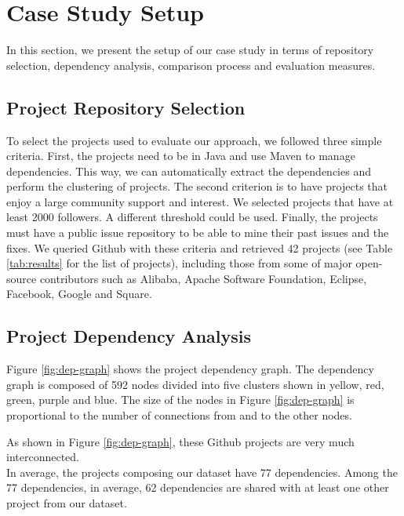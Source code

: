 \section{Case Study Setup}\label{sec:exp}

In this section, we present the setup of our case study in terms of
repository selection, dependency analysis, comparison process and
evaluation measures.

\subsection{Project Repository Selection}\label{sec:rep}

To select the projects used to evaluate our approach, we followed three
simple criteria. First, the projects need to be in Java and use Maven to
manage dependencies. This way, we can automatically extract the
dependencies and perform the clustering of projects. The second
criterion is to have projects that enjoy a large community support and
interest. We selected projects that have at least 2000 followers. A
different threshold could be used. Finally, the projects must have a
public issue repository to be able to mine their past issues and the
fixes. We queried Github with these criteria and retrieved 42 projects
(see Table \ref{tab:results} for the list of projects), including those
from some of major open-source contributors such as Alibaba, Apache
Software Foundation, Eclipse, Facebook, Google and Square.

\subsection{Project Dependency Analysis}\label{sec:dependencies}

Figure \ref{fig:dep-graph} shows the project dependency graph. The
dependency graph is composed of 592 nodes divided into five clusters
shown in yellow, red, green, purple and blue. The size of the nodes in
Figure \ref{fig:dep-graph} is proportional to the number of connections
from and to the other nodes.



As shown in Figure \ref{fig:dep-graph}, these Github projects are very
much interconnected.\\
In average, the projects composing our dataset have 77 dependencies.
Among the 77 dependencies, in average, 62 dependencies are shared with
at least one other project from our dataset.

